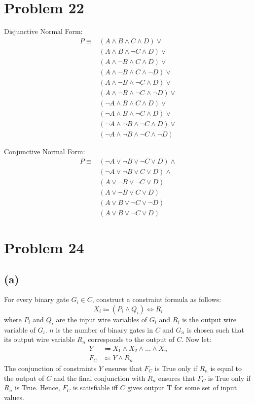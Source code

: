 \documentclass{article}
\begin{document}
\section{Problem 22}
Disjunctive Normal Form:
\begin{align*}
	P \equiv & (A \land B \land C \land D) \lor                \\
	         & (A \land B \land \neg C \land D) \lor           \\
	         & (A \land \neg B \land C \land D) \lor           \\
	         & (A \land \neg B \land C \land \neg D) \lor      \\
	         & (A \land \neg B \land \neg C \land D) \lor      \\
	         & (A \land \neg B \land \neg C \land \neg D) \lor \\
	         & (\neg A \land B \land C \land D) \lor           \\
	         & (\neg A \land B \land \neg C \land D) \lor      \\
	         & (\neg A \land \neg B \land \neg C \land D) \lor \\
	         & (\neg A \land \neg B \land \neg C \land \neg D)
\end{align*}

Conjunctive Normal Form:
\begin{align*}
	P \equiv & (\neg A \lor \neg B \lor \neg C \lor D) \land \\
	         & (\neg A \lor \neg B \lor C \lor D) \land      \\
	         & (A \lor \neg B \lor \neg C \lor D)            \\
	         & (A \lor \neg B \lor C \lor D)                 \\
	         & (A \lor B \lor \neg C \lor \neg D)            \\
	         & (A \lor B \lor \neg C \lor D)
\end{align*}

\pagebreak

\section{Problem 24}
\subsection{(a)}
For every binary gate $G_i \in C$, construct a constraint formula as follows:
\[
	X_i \Coloneqq (P_i \land Q_i) \iff R_i
\]
where $P_i$ and $Q_i$ are the input wire variables of $G_i$ and $R_i$ is the output wire variable of $G_i$. $n$ is the number of binary gates in $C$ and $G_n$ is chosen such that its output wire variable $R_n$ corresponds to the output of $C$. Now let:
\begin{align*}
	Y   & \Coloneqq X_1 \land X_2 \land ... \land X_n \\
	F_C & \Coloneqq Y \land R_n
\end{align*}
The conjunction of constraints $Y$ ensures that $F_C$ is True only if $R_n$ is equal to the output of $C$ and the final conjunction with $R_n$ ensures that $F_C$ is True only if $R_n$ is True. Hence, $F_C$ is satisfiable iff $C$ gives output T for some set of input values.
\end{document}
